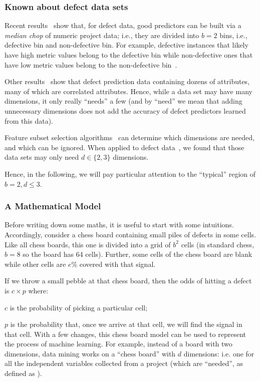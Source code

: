 \subsubsection{Known about defect data sets}\label{sect:data}

Recent
results~\cite{Zhang14,nam2015clami} show that, for defect data, good
predictors can be built via a {\em median chop} of
numeric project data;
i.e., they are divided into $b=2$ bins, i.e., defective bin and non-defective bin. For example, defective instances that likely have high metric values belong to the defective bin while non-defective ones that have low metric values belong to the non-defective bin~\cite{nam2015clami}.

Other results~\cite{shepperd94}
show that defect prediction data containing dozens
of attributes, many of which are correlated
attributes. Hence, while a data set may have many dimensions, it only really ``needs'' a few
(and by ``need'' we mean that adding unnecessary dimensions does not add the accuracy
of defect predictors learned from this data).


Feature subset selection algorithms~\cite{Hall03} can  determine
which  dimensions are needed, and which can be ignored.
When applied to defect data~\cite{Menzies07},
we found that those data sets may only need  $d \in \{2,3\}$
dimensions.

Hence, in the following, we will pay particular attention to the ``typical'' region of
 $b=2, d \le 3$.

\subsubsection{A Mathematical Model}

Before writing down some maths, it is useful to start with some intuitions.
Accordingly, consider a chess board  containing small  piles of defects in some cells.
Like all chess boards, this one is  divided into a grid of $b^2$ cells (in standard chess, $b=8$ so the board has 64 cells).
Further, some cells of the chess board are blank while other cells are $e$\% covered
with that signal.

If we throw a small pebble at that chess board, then  the odds
of hitting a defect is $c \times p$ where:
\squishlist
\item $c$ is the probability of picking a particular cell;
\item $p$ is the probability that, once we arrive at that cell, we will find  the  signal in that cell.
\squishend
With a few changes, this chess board model can be
used to represent the process of machine
learning. For example,
instead of a board with two
dimensions, data mining works on a ``chess board''
with $d$ dimensions: i.e. one for all the independent
variables collected from a project (which are ``needed'', as defined as ).

